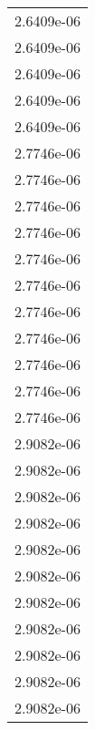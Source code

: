 \begin{tabular}{l}
2.6409e-06 \\ 
2.6409e-06 \\ 
2.6409e-06 \\ 
2.6409e-06 \\ 
2.6409e-06 \\ 
2.7746e-06 \\ 
2.7746e-06 \\ 
2.7746e-06 \\ 
2.7746e-06 \\ 
2.7746e-06 \\ 
2.7746e-06 \\ 
2.7746e-06 \\ 
2.7746e-06 \\ 
2.7746e-06 \\ 
2.7746e-06 \\ 
2.7746e-06 \\ 
2.9082e-06 \\ 
2.9082e-06 \\ 
2.9082e-06 \\ 
2.9082e-06 \\ 
2.9082e-06 \\ 
2.9082e-06 \\ 
2.9082e-06 \\ 
2.9082e-06 \\ 
2.9082e-06 \\ 
2.9082e-06 \\ 
2.9082e-06 \\ 
\hline 
\end{tabular}